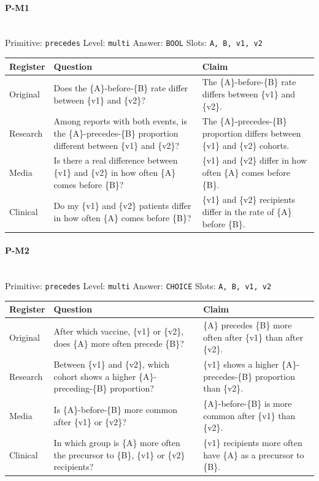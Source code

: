 \documentclass[11pt]{article}
\begin{document}
\paragraph{\textbf{P-M1}}\mbox{}\\
Primitive: \texttt{precedes} \quad Level: \texttt{multi} \quad Answer: \texttt{BOOL} \quad Slots: \texttt{A, B, v1, v2}\\[2pt]
\begin{tabularx}{\linewidth}{@{}l L L@{}}
\toprule
\textbf{Register} & \textbf{Question} & \textbf{Claim} \\
\midrule
Original & Does the \{A\}-before-\{B\} rate differ between \{v1\} and \{v2\}? & The \{A\}-before-\{B\} rate differs between \{v1\} and \{v2\}. \\
Research & Among reports with both events, is the \{A\}-precedes-\{B\} proportion different between \{v1\} and \{v2\}? & The \{A\}-precedes-\{B\} proportion differs between \{v1\} and \{v2\} cohorts. \\
Media & Is there a real difference between \{v1\} and \{v2\} in how often \{A\} comes before \{B\}? & \{v1\} and \{v2\} differ in how often \{A\} comes before \{B\}. \\
Clinical & Do my \{v1\} and \{v2\} patients differ in how often \{A\} comes before \{B\}? & \{v1\} and \{v2\} recipients differ in the rate of \{A\} before \{B\}. \\
\bottomrule
\end{tabularx}
\vspace{4pt}

\paragraph{\textbf{P-M2}}\mbox{}\\
Primitive: \texttt{precedes} \quad Level: \texttt{multi} \quad Answer: \texttt{CHOICE} \quad Slots: \texttt{A, B, v1, v2}\\[2pt]
\begin{tabularx}{\linewidth}{@{}l L L@{}}
\toprule
\textbf{Register} & \textbf{Question} & \textbf{Claim} \\
\midrule
Original & After which vaccine, \{v1\} or \{v2\}, does \{A\} more often precede \{B\}? & \{A\} precedes \{B\} more often after \{v1\} than after \{v2\}. \\
Research & Between \{v1\} and \{v2\}, which cohort shows a higher \{A\}-preceding-\{B\} proportion? & \{v1\} shows a higher \{A\}-precedes-\{B\} proportion than \{v2\}. \\
Media & Is \{A\}-before-\{B\} more common after \{v1\} or \{v2\}? & \{A\}-before-\{B\} is more common after \{v1\} than \{v2\}. \\
Clinical & In which group is \{A\} more often the precursor to \{B\}, \{v1\} or \{v2\} recipients? & \{v1\} recipients more often have \{A\} as a precursor to \{B\}. \\
\bottomrule
\end{tabularx}
\vspace{4pt}
\end{document}
